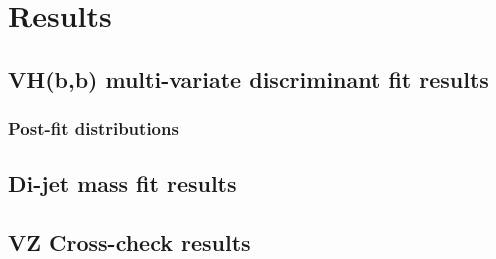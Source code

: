 \chapter{Results}%
\label{ch:results}
\section{VH(b,b) multi-variate discriminant fit results}%
\label{sec:mva-results}
\subsection{Post-fit distributions}



\section{Di-jet mass fit results}%
\label{sec:mbb-results}
\section{VZ Cross-check results}%
\label{sec:VZ-results}

